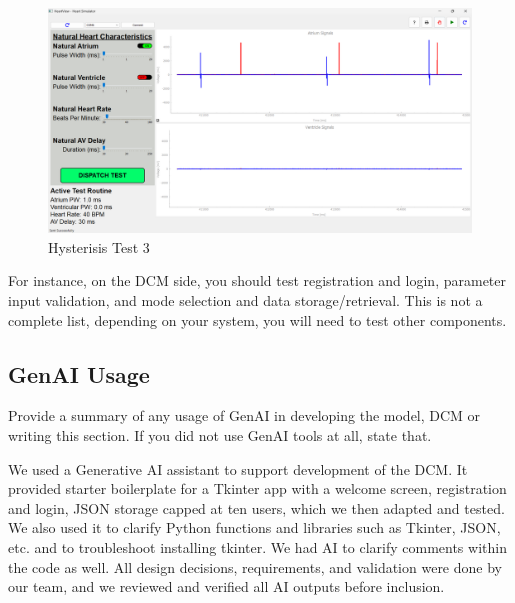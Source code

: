 \documentclass{article}
\begin{document}
\begin{tcolorbox}
    \begin{figure}[H]\label{Hystest3}
        \includegraphics[width=\textwidth]{hytheresistest3.png}
        \caption{Hysterisis Test 3}
        
    \end{figure}
\end{tcolorbox}

For instance, on the DCM side, you should test registration and login, parameter input validation, and mode selection and data storage/retrieval. This is not a complete list, depending on your system, you will need to test other components.

\newpage
\subsection{GenAI Usage}
Provide a summary of any usage of GenAI in developing the model, DCM or writing this section. If you did not use GenAI tools at all, state that.

We used a Generative AI assistant to support development of the DCM. It provided starter boilerplate for a 
Tkinter app with a welcome screen, registration and login, JSON storage capped at ten users, which we then 
adapted and tested. We also used it to clarify Python functions and libraries such as Tkinter, JSON, etc. 
and to troubleshoot installing tkinter. We had AI to clarify comments within the code as well. All design 
decisions, requirements, and validation were done by our team, and we reviewed and verified all AI outputs 
before inclusion. 


\end{document}
